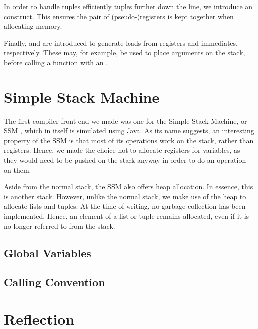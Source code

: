 In order to handle tuples efficiently tuples further down the line, we introduce an  construct.
This ensures the pair of (pseudo-)registers is kept together when allocating memory.

Finally,  and  are introduced to generate loads from registers and immediates, respectively.
These may, for example, be used to place arguments on the stack, before calling a function with an .


\section{Simple Stack Machine}

The first compiler front-end we made was one for the Simple Stack Machine, or SSM \cite{SSM}, which in itself is simulated using Java.
As its name suggests, an interesting property of the SSM is that most of its operations work on the stack, rather than registers.
Hence, we made the choice not to allocate registers for variables, as they would need to be pushed on the stack anyway in order to do an operation on them.

Aside from the normal stack, the SSM also offers heap allocation.
In essence, this is another stack.
However, unlike the normal stack, we make use of the heap to allocate lists and tuples.
At the time of writing, no garbage collection has been implemented.
Hence, an element of a list or tuple remains allocated, even if it is no longer referred to from the stack.


\subsection{Global Variables}


\subsection{Calling Convention}





\section{Reflection}


